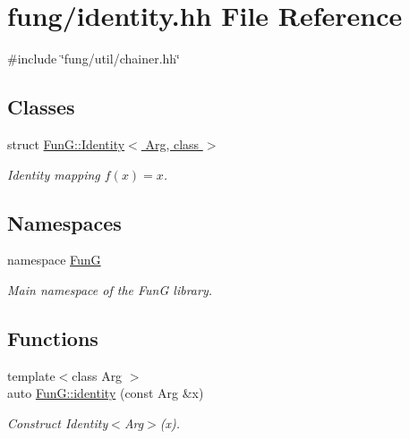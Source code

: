 \hypertarget{identity_8hh}{\section{fung/identity.hh \-File \-Reference}
\label{identity_8hh}
}
{\ttfamily \#include \char`\"{}fung/util/chainer.\-hh\char`\"{}}\*
\subsection*{\-Classes}
\begin{DoxyCompactItemize}
\item 
struct \hyperlink{structFunG_1_1Identity}{\-Fun\-G\-::\-Identity$<$ Arg, class $>$}
\begin{DoxyCompactList}\small\item\em \-Identity mapping $ f(x)=x $. \end{DoxyCompactList}\end{DoxyCompactItemize}
\subsection*{\-Namespaces}
\begin{DoxyCompactItemize}
\item 
namespace \hyperlink{namespaceFunG}{\-Fun\-G}
\begin{DoxyCompactList}\small\item\em \-Main namespace of the \-Fun\-G library. \end{DoxyCompactList}\end{DoxyCompactItemize}
\subsection*{\-Functions}
\begin{DoxyCompactItemize}
\item 
{\footnotesize template$<$class Arg $>$ }\\auto \hyperlink{namespaceFunG_a165e879e76d3a2a8906938f3658445ce}{\-Fun\-G\-::identity} (const \-Arg \&x)
\begin{DoxyCompactList}\small\item\em \-Construct \-Identity$<$\-Arg$>$(x). \end{DoxyCompactList}\end{DoxyCompactItemize}
